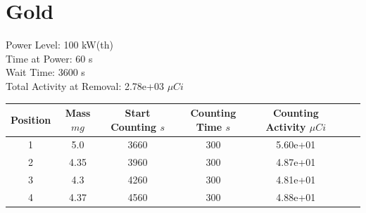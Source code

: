 \newpage

\section*{ Gold }

Power Level: 100 kW(th) \\
Time at Power: 60 s \\
Wait Time: 3600 s \\
Total Activity at Removal: 2.78e+03 $\mu Ci$

\begin{table}[h]
\centering
\begin{tabular}{ |c|c|c|c|c|c|c| }
 \hline
 Position & Mass $mg$ & Start Counting $s$ & Counting Time $s$ & Counting Activity $\mu Ci$ \\
 \hline 
 1 & 5.0 & 3660 & 300 & 5.60e+01\\ 
\hline
 2 & 4.35 & 3960 & 300 & 4.87e+01\\ 
\hline
 3 & 4.3 & 4260 & 300 & 4.81e+01\\ 
\hline
 4 & 4.37 & 4560 & 300 & 4.88e+01\\ 
\hline
\end{tabular}
\end{table}

